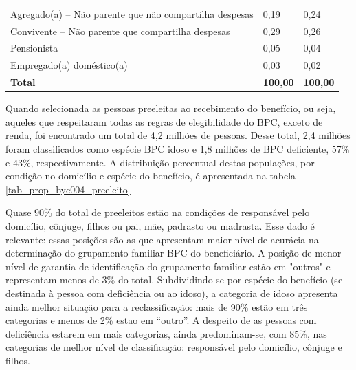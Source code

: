 \documentclass[
	12pt,				%
	openright,			%
	twoside,			%
	a4paper,			%
	english,			%
	french,				%
	spanish,			%
	brazil				%
	]{abntex2}
\begin{document}
\begin{table}[H]
\begin{tabular}{@{}lm{4cm}m{3cm}@{}}
		Agregado(a) – Não parente que não compartilha despesas & 0,19                            & 0,24            \\
		Convivente – Não parente que compartilha despesas      & 0,29                            & 0,26            \\
		Pensionista                                            & 0,05                            & 0,04            \\
		Empregado(a) doméstico(a)                              & 0,03                            & 0,02            \\ \midrule
		\textbf{Total}                                         & \textbf{100,00}                 & \textbf{100,00} \\ \bottomrule
	\end{tabular}
\end{table}

Quando selecionada as pessoas preeleitas ao recebimento do benefício, ou seja, aqueles que respeitaram todas as regras de elegibilidade do BPC, exceto de renda, foi encontrado um total de 4,2 milhões de pessoas. Desse total, 2,4 milhões foram classificados como espécie BPC idoso e 1,8 milhões de BPC deficiente, 57\% e 43\%, respectivamente. A distribuição percentual destas populações, por condição no domicílio e espécie do benefício, é apresentada na tabela \ref*{tab_prop_byc004_preeleito}


Quase 90\% do total de preeleitos estão na condições de responsável pelo domicílio, cônjuge, filhos ou pai, mãe, padrasto ou madrasta. Esse dado é relevante: essas posições são as que apresentam maior nível de acurácia na determinação do grupamento familiar BPC do beneficiário. A posição de menor nível de garantia de identificação do grupamento familiar estão em "outros" e representam  menos de 3\% do total. Subdividindo-se por espécie do benefício (se destinada à pessoa com deficiência ou ao idoso), a categoria de idoso apresenta ainda melhor situação para a reclassificação: mais de 90\% estão em três categorias e menos de 2\% estao em ``outro''. A despeito de as pessoas com deficiência estarem em mais categorias, ainda predominam-se, com 85\%, nas categorias de melhor nível de classificação: responsável pelo domicílio, cônjuge e filhos.
 
\end{document}
